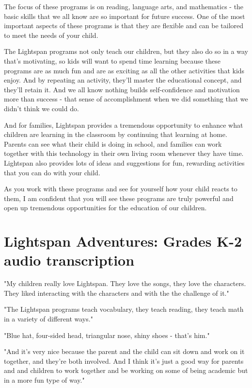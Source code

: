The focus of these programs is on reading, language arts, and mathematics - the basic skills that we all know are so important for future success.
One of the most important aspects of these programs is that they are flexible and can be tailored to meet the needs of your child.

The Lightspan programs not only teach our children, but they also do so in a way that's motivating, so kids will want to spend time learning because these programs are as much fun and are as exciting as all the other activities that kids enjoy.
And by repeating an activity, they'll master the educational concept, and they'll retain it.
And we all know nothing builds self-confidence and motivation more than success - that sense of accomplishment when we did something that we didn't think we could do.

And for families, Lightspan provides a tremendous opportunity to enhance what children are learning in the classroom by continuing that learning at home.
Parents can see what their child is doing in school, and families can work together with this technology in their own living room whenever they have time.
Lightspan also provides lots of ideas and suggestions for fun, rewarding activities that you can do with your child.

As you work with these programs and see for yourself how your child reacts to them, I am confident that you will see these programs are truly powerful and open up tremendous opportunities for the education of our children.

\section{Lightspan Adventures: Grades K-2 audio transcription}

"My children really love Lightspan.
They love the songs, they love the characters.
They liked interacting with the characters and with the the challenge of it."

"The Lightspan programs teach vocabulary, they teach reading, they teach math in a variety of different ways."

"Blue hat, four-sided head, triangular nose, shiny shoes - that's him."

"And it's very nice because the parent and the child can sit down and work on it together, and they're both involved.
And I think it's just a good way for parents and and children to work together and be working on some of being academic but in a more fun type of way."

